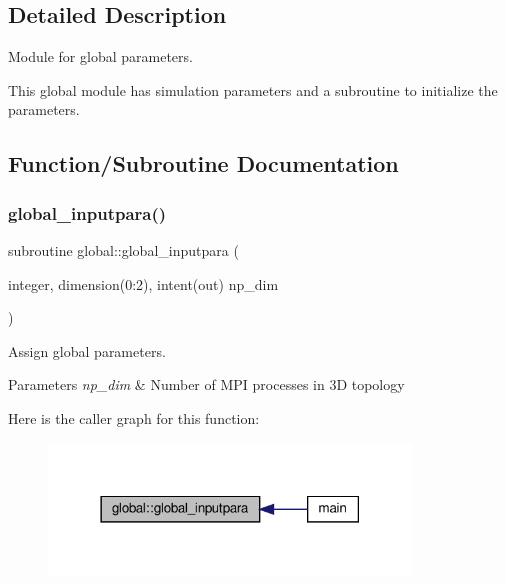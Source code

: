 \subsection{Detailed Description}
Module for global parameters. 

This global module has simulation parameters and a subroutine to initialize the parameters. 

\subsection{Function/\+Subroutine Documentation}
\mbox{\label{namespaceglobal_a930b565da2644b675f35b91735e11ce3}} 
\subsubsection{\texorpdfstring{global\+\_\+inputpara()}{global\_inputpara()}}
{\footnotesize\ttfamily subroutine global\+::global\+\_\+inputpara (\begin{DoxyParamCaption}\item[{integer, dimension(0\+:2), intent(out)}]{np\+\_\+dim }\end{DoxyParamCaption})}



Assign global parameters. 


\begin{DoxyParams}{Parameters}
{\em np\+\_\+dim} & Number of M\+PI processes in 3D topology \\
\hline
\end{DoxyParams}
Here is the caller graph for this function\+:
\nopagebreak
\begin{figure}[H]
\begin{center}
\leavevmode
\includegraphics[width=273pt]{namespaceglobal_a930b565da2644b675f35b91735e11ce3_icgraph}
\end{center}
\end{figure}


